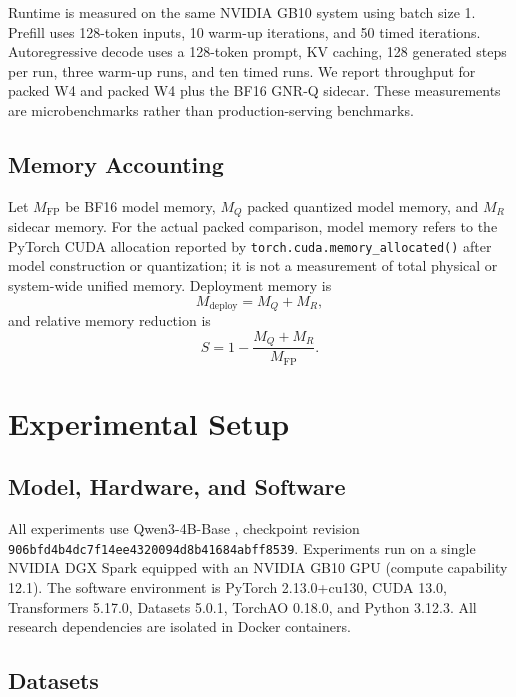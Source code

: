 \documentclass[11pt]{article}
\begin{document}
Runtime is measured on the same NVIDIA GB10 system using batch size 1. Prefill uses 128-token inputs, 10 warm-up iterations, and 50 timed iterations. Autoregressive decode uses a 128-token prompt, KV caching, 128 generated steps per run, three warm-up runs, and ten timed runs. We report throughput for packed W4 and packed W4 plus the BF16 GNR-Q sidecar. These measurements are microbenchmarks rather than production-serving benchmarks.

\subsection{Memory Accounting}

Let $M_{\mathrm{FP}}$ be BF16 model memory, $M_Q$ packed quantized model memory, and $M_R$ sidecar memory. For the actual packed comparison, model memory refers to the PyTorch CUDA allocation reported by \texttt{torch.cuda.memory\_allocated()} after model construction or quantization; it is not a measurement of total physical or system-wide unified memory. Deployment memory is
\begin{equation}
 M_{\mathrm{deploy}} = M_Q + M_R,
\end{equation}
and relative memory reduction is
\begin{equation}
 S = 1 - \frac{M_Q+M_R}{M_{\mathrm{FP}}}.
\end{equation}

\section{Experimental Setup}

\subsection{Model, Hardware, and Software}

All experiments use Qwen3-4B-Base \cite{yang2025qwen3}, checkpoint revision \texttt{906bfd4b4dc7f14ee4320094d8b41684\allowbreak abff8539}. Experiments run on a single NVIDIA DGX Spark equipped with an NVIDIA GB10 GPU (compute capability 12.1). The software environment is PyTorch 2.13.0+cu130, CUDA 13.0, Transformers 5.17.0, Datasets 5.0.1, TorchAO 0.18.0, and Python 3.12.3. All research dependencies are isolated in Docker containers.

\subsection{Datasets}
\end{document}
